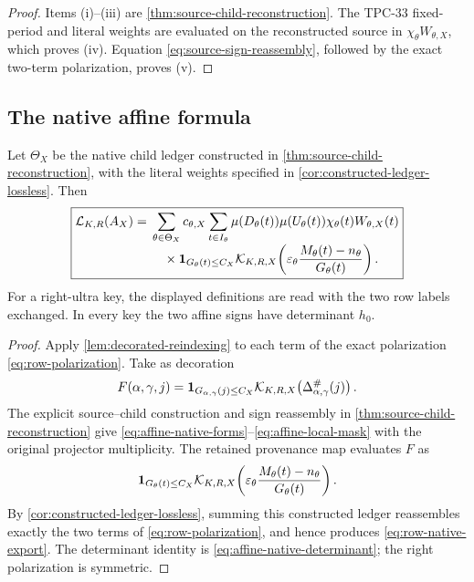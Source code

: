 \begin{proof}
Items (i)--(iii) are
\cref{thm:source-child-reconstruction}.  The TPC-33 fixed-period and
literal weights are evaluated on the reconstructed source in
\(\chi_\theta W_{\theta,X}\), which proves (iv).
Equation \eqref{eq:source-sign-reassembly}, followed by the exact
two-term polarization, proves (v).
\end{proof}

\subsection{The native affine formula}

\begin{theorem}
\label{thm:decorated-affine-export}
Let \(\Theta_X\) be the native child ledger constructed in
\cref{thm:source-child-reconstruction}, with the literal weights
specified in \cref{cor:constructed-ledger-lossless}.  Then
\begin{equation}
 \boxed{\begin{aligned}
 \mathcal L_{K,R}(A_X)
 ={}&
 \sum_{\theta\in\Theta_X}c_{\theta,X}
 \sum_{t\in I_\theta}
 \mu(D_\theta(t))\mu(U_\theta(t))
 \chi_\theta(t)W_{\theta,X}(t)
 \\[-1mm]
 &\quad\times
 \mathbf 1_{G_\theta(t)\le C_X}
 \mathcal K_{K,R,X}\!\left(
 \varepsilon_\theta
 \frac{M_\theta(t)-n_\theta}{G_\theta(t)}
 \right).
 \end{aligned}}
\label{eq:decorated-affine-export}
\end{equation}
For a right-ultra key, the displayed definitions are read with the
two row labels exchanged.  In every key the two affine signs have
determinant \(h_0\).
\end{theorem}

\begin{proof}
Apply \cref{lem:decorated-reindexing} to each term of the exact
polarization \eqref{eq:row-polarization}.  Take as decoration
\[
 F(\alpha,\gamma,j)
 =
 \mathbf 1_{G_{\alpha,\gamma}(j)\le C_X}
 \mathcal K_{K,R,X}\!\left(
 \Delta^\#_{\alpha,\gamma}(j)\right).
\]
The explicit source--child construction and sign reassembly in
\cref{thm:source-child-reconstruction} give
\eqref{eq:affine-native-forms}--\eqref{eq:affine-local-mask} with
the original projector multiplicity.
The retained provenance map evaluates \(F\) as
\[
 \mathbf 1_{G_\theta(t)\le C_X}
 \mathcal K_{K,R,X}\!\left(
 \varepsilon_\theta
 \frac{M_\theta(t)-n_\theta}{G_\theta(t)}\right).
\]
By \cref{cor:constructed-ledger-lossless}, summing this constructed ledger
reassembles exactly the two terms of
\eqref{eq:row-polarization}, and hence produces
\eqref{eq:row-native-export}.  The determinant identity is
\eqref{eq:affine-native-determinant}; the right polarization is
symmetric.
\end{proof}

